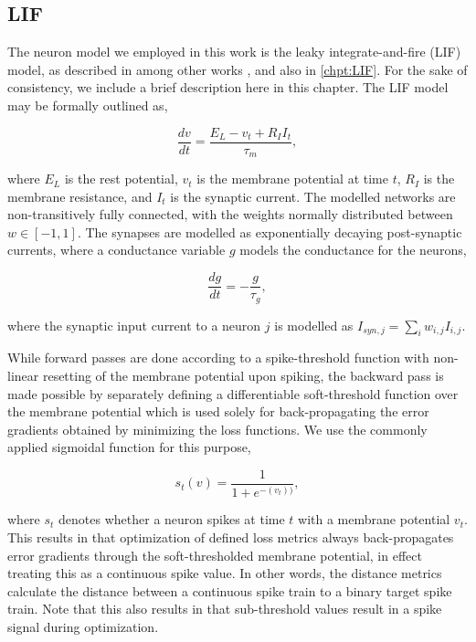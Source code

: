 \documentclass[mphil,deptreport,ianc]{infthesis} %
\begin{document}
\subsection{LIF}


The neuron model we employed in this work is the leaky integrate-and-fire (LIF) model, as described in among other works \cite{Rolls1998Book}, and also in 
\ref{chpt:LIF}. For the sake of consistency, we include a brief description here in this chapter. The LIF model may be formally outlined as,

\begin{equation}
    \frac{dv}{dt} = \frac{E_L - v_t + R_I I_t}{\tau_m},
\end{equation}

where $E_L$ is the rest potential, $v_t$ is the membrane potential at time $t$, $R_I$ is the membrane resistance, and $I_t$ is the synaptic current.
The modelled networks are non-transitively fully connected, with the weights normally distributed between $w \in [-1, 1]$. The synapses are modelled as exponentially decaying post-synaptic currents, where a conductance variable $g$ models the conductance for the neurons,

\begin{equation}
    \frac{dg}{dt} = -\frac{g}{\tau_g},
\end{equation}

where the synaptic input current to a neuron $j$ is modelled as $I_{syn,j} = \sum_{i} w_{i,j} I_{i,j}$.

While forward passes are done according to a spike-threshold function with non-linear resetting of the membrane potential upon spiking, the backward pass is made possible by separately defining a differentiable soft-threshold function over the membrane potential which is used solely for back-propagating the error gradients obtained by minimizing the loss functions. We use the commonly applied sigmoidal function for this purpose,

\begin{equation}
    s_t(v) = \frac{1}{1+e^{-(v_t))}},
\end{equation}

where $s_t$ denotes whether a neuron spikes at time $t$ with a membrane potential $v_t$.
This results in that optimization of defined loss metrics always back-propagates error gradients through the soft-thresholded membrane potential, in effect treating this as a continuous spike value. 
In other words, the distance metrics calculate the distance between a continuous spike train to a binary target spike train.
Note that this also results in that sub-threshold values result in a spike signal during optimization.
\end{document}
